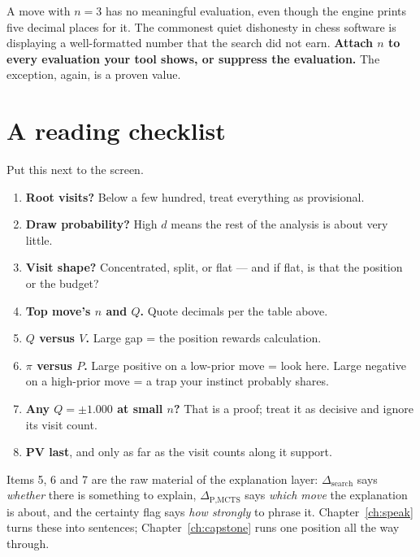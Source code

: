 \begin{keyidea}
A move with $n = 3$ has no meaningful evaluation, even though the engine prints five decimal
places for it. The commonest quiet dishonesty in chess software is displaying a
well-formatted number that the search did not earn. \textbf{Attach $n$ to every evaluation
your tool shows, or suppress the evaluation.} The exception, again, is a proven value.
\end{keyidea}

\section{A reading checklist}

Put this next to the screen.

\begin{enumerate}
\item \textbf{Root visits?} Below a few hundred, treat everything as provisional.
\item \textbf{Draw probability?} High $d$ means the rest of the analysis is about very little.
\item \textbf{Visit shape?} Concentrated, split, or flat --- and if flat, is that the position
  or the budget?
\item \textbf{Top move's $n$ and $Q$.} Quote decimals per the table above.
\item \textbf{$Q$ versus $V$.} Large gap = the position rewards calculation.
\item \textbf{$\pi$ versus $P$.} Large positive on a low-prior move = look here. Large
  negative on a high-prior move = a trap your instinct probably shares.
\item \textbf{Any $Q = \pm1.000$ at small $n$?} That is a proof; treat it as decisive and
  ignore its visit count.
\item \textbf{PV last}, and only as far as the visit counts along it support.
\end{enumerate}

\begin{repobox}[title={in this repository}]
Items 5, 6 and 7 are the raw material of the explanation layer: $\Delta_{\text{search}}$ says
\emph{whether} there is something to explain, $\Delta_{\text{P,MCTS}}$ says \emph{which move}
the explanation is about, and the certainty flag says \emph{how strongly} to phrase it.
Chapter~\ref{ch:speak} turns these into sentences; Chapter~\ref{ch:capstone} runs one
position all the way through.
\end{repobox}

